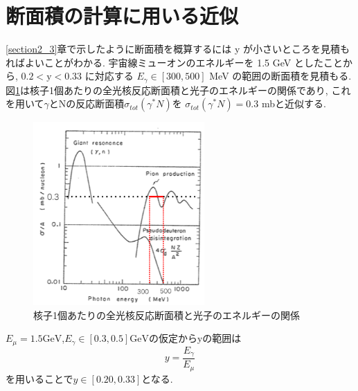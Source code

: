 \section{断面積の計算に用いる近似}
\ref{section2_3}章で示したように断面積を概算するには y が小さいところを見積もればよいことがわかる.
宇宙線ミューオンのエネルギーを 1.5 GeV としたことから,
$0.2 < \mathrm{y} < 0.33$ に対応する $E_\gamma \in [300, 500]$ MeV の範囲の断面積を見積もる.
図\ref{fig:sigma4}は核子1個あたりの全光核反応断面積と光子のエネルギーの関係であり, これを用いて$\gamma$とNの反応断面積$\sigma_{tot}(\gamma^* N)$を
$\sigma_{tot}(\gamma^* N) = 0.3$ mbと近似する.
\begin{figure}[H]
    \centering
    \includegraphics[height=7cm]{img/sigma_tot.png}
    \caption{核子1個あたりの全光核反応断面積と光子のエネルギーの関係}
    \label{fig:sigma4}
\end{figure}
$E_\mu = 1.5 \mathrm{GeV}$,$E_\gamma \in [0.3, 0.5] \mathrm{GeV}$の仮定からyの範囲は
\begin{equation}
    y = \dfrac{E_\gamma}{E_\mu}
\end{equation}
を用いることで$y \in [0.20, 0.33]$となる.

